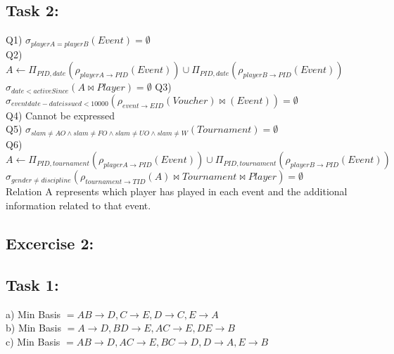 \documentclass[12pt] {article}
\begin{document}
        \subsection*{Task 2:}
        \begin{flushleft}
        Q1) $\sigma_{playerA = playerB}(Event) = \emptyset$\\
        \bigskip
        Q2) $ A \leftarrow \Pi_{PID, date}(\rho_{playerA \rightarrow PID}(Event)) \cup \Pi_{PID, date}(\rho_{playerB\rightarrow PID}(Event))$\\
        $\sigma_{date < activeSince}(A \bowtie Player) = \emptyset$
        \bigskip
        Q3) $\sigma_{eventdate - dateissued < 10000}(\rho_{event \rightarrow EID}(Voucher) \bowtie (Event)) = \emptyset$\\
        \bigskip
        Q4) Cannot be expressed\\
        \bigskip
        Q5) $\sigma_{slam \neq AO \wedge slam \neq FO \wedge slam \neq UO \wedge slam \neq W }(Tournament) = \emptyset$\\
        \bigskip
        Q6) $ A \leftarrow \Pi_{PID, tournament}(\rho_{playerA \rightarrow PID}(Event)) \cup \Pi_{PID, tournament}(\rho_{playerB\rightarrow PID}(Event))$\\
        $\sigma_{gender \neq discipline}(\rho_{tournament \rightarrow TID}(A) \bowtie Tournament \bowtie Player) = \emptyset$\\
        \bigskip
        Relation A  represents which player has played in each event and the additional information related to that event.\\
        \end{flushleft}

        \subsection*{Excercise 2:}
        \bigskip
        \subsection*{Task 1:}
        \bigskip
        \begin{flushleft}
        a) Min Basis $= AB \rightarrow D, C \rightarrow E, D \rightarrow C, E \rightarrow A $\\
        b) Min Basis $= A \rightarrow D, BD \rightarrow E, AC \rightarrow E, DE \rightarrow B$\\
        c) Min Basis $= AB \rightarrow D, AC \rightarrow E, BC \rightarrow D, D \rightarrow A, E \rightarrow B$\\
        \end{flushleft}
        \medskip
\end{document}
